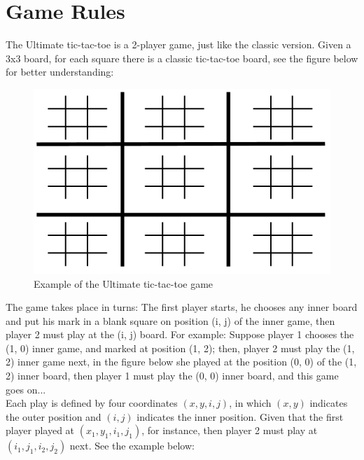 \documentclass[10pt]{article}
\begin{document}
\section{Game Rules}
The Ultimate tic-tac-toe is a 2-player game, just like the classic version. Given a 3x3 board, for each square there is a classic tic-tac-toe board, see the figure below for better understanding:

\begin{figure}[h]
\centering
\includegraphics[scale=0.3]{img/ultimate.png}
\caption{Example of the Ultimate tic-tac-toe game}
\end{figure}


The game takes place in turns: The first player starts, he chooses any inner board and put his mark in a blank square on position (i, j) of the inner game, then player 2 must play at the (i, j) board. For example: Suppose player 1 chooses the (1, 0) inner game, and marked at position (1, 2); then, player 2 must play the (1, 2) inner game next, in the figure below she played at the position (0, 0) of the (1, 2) inner board, then player 1 must play the (0, 0) inner board, and this game goes on...\\

Each play is defined by four coordinates $(x, y, i, j)$, in which $(x, y)$ indicates the outer position and $(i, j)$ indicates the inner position. Given that the first player played at $(x_1, y_1, i_1, j_1)$, for instance, then player 2 must play at $(i_1, j_1, i_2, j_2)$ next. See the example below:
\end{document}
